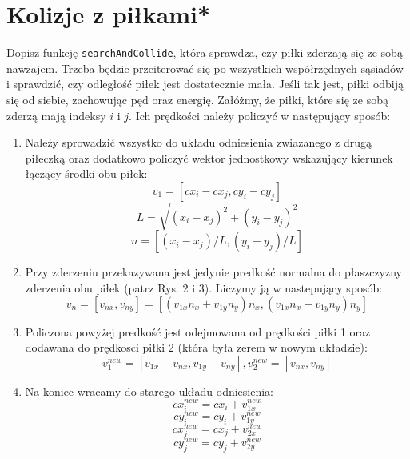 \documentclass{instrukcja}
\begin{document}
\section{Kolizje z piłkami*}Dopisz funkcję {\tt searchAndCollide}, która sprawdza, czy piłki zderzają się ze sobą nawzajem.
Trzeba będzie przeiterować się po wszystkich współrzędnych sąsiadów i sprawdzić, czy odległość piłek jest dostatecznie mała.
Jeśli tak jest, piłki odbiją się od siebie, zachowując pęd oraz energię. 
Załóżmy, że piłki, które się ze sobą zderzą mają indeksy \(i\) i \(j\). Ich prędkości należy policzyć w następujący sposób:
\begin{enumerate}
\item Należy sprowadzić wszystko do układu odniesienia zwiazanego z drugą piłeczką oraz dodatkowo policzyć wektor jednostkowy wskazujący kierunek łączący środki obu piłek:
\begin{displaymath}
v_{1}= [cx_{i} - cx_{j}, cy_{i} - cy_{j}]
\end{displaymath}
\begin{displaymath}
L=\sqrt{(x_{i}-x_{j})^2 +(y_{i}-y_{j})^2 }
\end{displaymath}
\begin{displaymath}
n= [(x_{i}-x_{j})/L,(y_{i}-y_{j})/L]
\end{displaymath}
\item Przy zderzeniu przekazywana jest jedynie predkość normalna do płaszczyzny zderzenia obu piłek (patrz Rys. 2 i 3). Liczymy ją w nastepujący sposób:
\begin{displaymath}
v_{n}= [v_{nx},v_{ny}]=[(v_{1x}n_{x}+v_{1y}n_{y})n_{x},(v_{1x}n_{x}+v_{1y}n_{y})n_{y}]
\end{displaymath}
\item Policzona powyżej predkość jest odejmowana od prędkości piłki 1 oraz dodawana do prędkosci piłki 2 (która była zerem w nowym układzie):
\begin{displaymath}
v_{1}^{new}= [v_{1x}-v_{nx}, v_{1y}-v_{ny}], v_{2}^{new}= [v_{nx},v_{ny}]
\end{displaymath}
\item Na koniec wracamy do starego układu odniesienia:
\begin{displaymath}
cx_{i}^{new}=cx_{i}+v_{1x}^{new}
\end{displaymath}
\begin{displaymath}
cy_{i}^{new}=cy_{i}+v_{1y}^{new}
\end{displaymath}
\begin{displaymath}
cx_{j}^{new}=cx_{j}+v_{2x}^{new}
\end{displaymath}
\begin{displaymath}
cy_{j}^{new}=cy_{j}+v_{2y}^{new}
\end{displaymath}
\end{enumerate}
\end{document}
